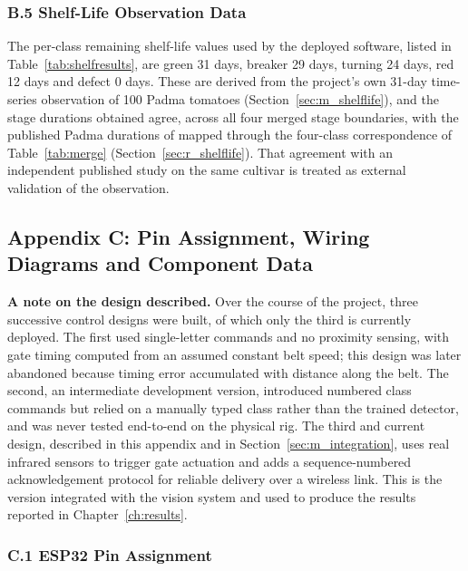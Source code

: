 \subsubsection*{B.5 Shelf-Life Observation Data}

The per-class remaining shelf-life values used by the deployed software, listed in Table~\ref{tab:shelfresults}, are green 31 days, breaker 29 days, turning 24 days, red 12 days and defect 0 days. These are derived from the project's own 31-day time-series observation of 100 Padma tomatoes (Section~\ref{sec:m_shelflife}), and the stage durations obtained agree, across all four merged stage boundaries, with the published Padma durations of \citet{abekoon2024} mapped through the four-class correspondence of Table~\ref{tab:merge} (Section~\ref{sec:r_shelflife}). That agreement with an independent published study on the same cultivar is treated as external validation of the observation.


\subsection*{Appendix C: Pin Assignment, Wiring Diagrams and Component Data}

\textbf{A note on the design described.} Over the course of the project, three successive control designs were built, of which only the third is currently deployed. The first used single-letter commands and no proximity sensing, with gate timing computed from an assumed constant belt speed; this design was later abandoned because timing error accumulated with distance along the belt. The second, an intermediate development version, introduced numbered class commands but relied on a manually typed class rather than the trained detector, and was never tested end-to-end on the physical rig. The third and current design, described in this appendix and in Section~\ref{sec:m_integration}, uses real infrared sensors to trigger gate actuation and adds a sequence-numbered acknowledgement protocol for reliable delivery over a wireless link. This is the version integrated with the vision system and used to produce the results reported in Chapter~\ref{ch:results}.

\subsubsection*{C.1 ESP32 Pin Assignment}

